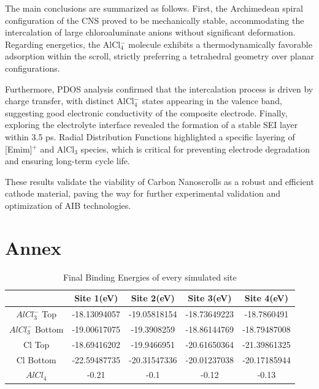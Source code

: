 \documentclass[aps,twocolumn,secnumarabic,nobalancelastpage,amsmath,amssymb,
nofootinbib,floatfix]{revtex4}
\begin{document}
The main conclusions are summarized as follows. First, the Archimedean spiral configuration of the CNS proved to be mechanically stable, accommodating the intercalation of large chloroaluminate anions without significant deformation. Regarding energetics, the AlCl$_4^-$ molecule exhibits a thermodynamically favorable adsorption within the scroll, strictly preferring a tetrahedral geometry over planar configurations.

Furthermore, PDOS analysis confirmed that the intercalation process is driven by charge transfer, with distinct AlCl$_4^-$ states appearing in the valence band, suggesting good electronic conductivity of the composite electrode. Finally, exploring the electrolyte interface revealed the formation of a stable SEI layer within 3.5 ps. Radial Distribution Functions highlighted a specific layering of [Emim]$^+$ and AlCl$_3$ species, which is critical for preventing electrode degradation and ensuring long-term cycle life.

These results validate the viability of Carbon Nanoscrolls as a robust and efficient cathode material, paving the way for further experimental validation and optimization of AIB technologies.

\section{Annex}
\begin{table}[h]
\begin{tabular}{|c|c|c|c|c|}
\hline
 & Site 1(eV) & Site 2(eV) & Site 3(eV) & Site 4(eV) \\
\hline
\(AlCl_{3}^{-}\) Top & -18.13094057 & -19.05818154 & -18.73649223 & -18.7860491
 \\
\hline
\(AlCl_{3}^{-}\) Bottom & -19.00617075  & -19.3908259
 & -18.86144769
 & -18.79487008
 \\
\hline
[Emim]Cl Top & -18.69416202 & -19.9466951 & -20.61650364 & -21.39861325 \\
\hline
[Emim]Cl Bottom & -22.59487735 & -20.31547336 & -20.01237038 & -20.17185944\\
\hline
\(AlCl_{4}\)& -0.21 & -0.1 & -0.12 & -0.13\\

\end{tabular}
\caption{Final Binding Energies of every simulated site}
\label{tab:ejemplo}
\end{table}


\end{document}

